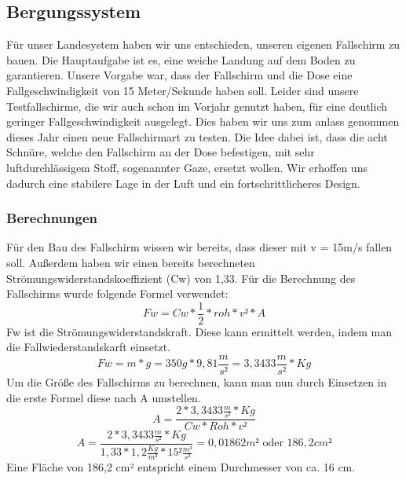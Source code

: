 \subsection{Bergungssystem}
Für unser Landesystem haben wir uns entschieden, unseren eigenen Fallschirm zu bauen. Die Hauptaufgabe ist es, eine weiche Landung auf dem Boden zu garantieren. Unsere Vorgabe war, dass der Fallschirm und die Dose eine Fallgeschwindigkeit von 15 Meter/Sekunde haben soll. Leider sind unsere Testfallschirme, die wir auch schon im Vorjahr genutzt haben, für eine deutlich geringer Fallgeschwindigkeit ausgelegt. Dies haben wir uns zum anlass genommen dieses Jahr einen neue Fallschirmart zu testen. Die Idee dabei ist, dass die acht Schnüre, welche den Fallschirm an der Dose befestigen, mit sehr luftdurchlässigem Stoff, sogenannter Gaze, ersetzt wollen. Wir erhoffen uns dadurch eine stabilere Lage in der Luft und ein fortschrittlicheres Design.

\subsubsection{Berechnungen}
Für den Bau des Fallschirm wissen wir bereits, dass dieser mit v = 15m/s fallen soll. Außerdem haben wir einen bereits berechneten Strömungswiderstandskoeffizient (Cw) von 1,33. Für die Berechnung des Fallschirms wurde folgende Formel verwendet:
\[
Fw = Cw*\frac{1}{2}*roh*v²*A
\]
Fw ist die Strömungswiderstandskraft. Diese kann ermittelt werden, indem man die Fallwiederstandskarft einsetzt.
\[
Fw = m * g = 350g * 9,81\frac{m}{s²} = 3,3433\frac{m}{s²}*Kg
\]
Um die Größe des Fallschirms zu berechnen, kann man nun durch Einsetzen in die erste Formel diese nach A umstellen.
\[
A=\frac{2*3,3433\frac{m}{s²}*Kg}{Cw*Roh*v²}
\]
\[
A=\frac{2*3,3433\frac{m}{s²}*Kg}{1,33*1,2\frac{Kg}{m³}*15²\frac{m²}{s²}} = 0,01862m² \text{ oder } 186,2cm²
\]
Eine Fläche von 186,2 cm² entspricht einem Durchmesser von ca. 16 cm.

